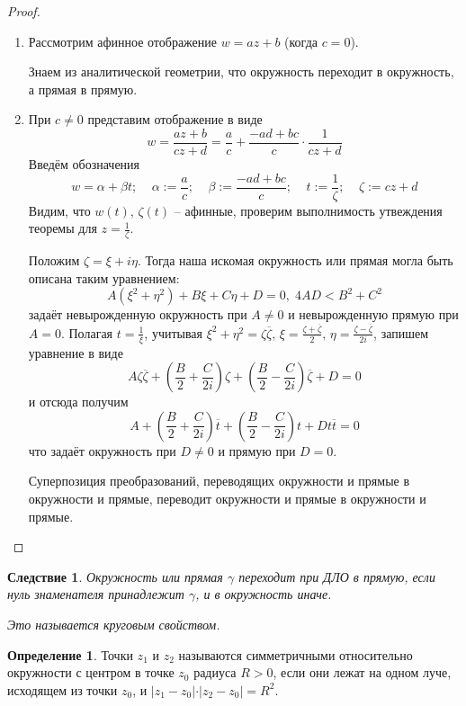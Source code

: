 \documentclass[a4paper,12pt]{article}
\theoremstyle{plain}
\newtheorem*{corollary}{Следствие}
\theoremstyle{definition}
\newtheorem{definition}{Определение}[section]
\theoremstyle{remark}
\begin{document}
\begin{proof}
	\begin{enumerate}
		\item Рассмотрим афинное отображение $w = az + b$ (когда $c = 0$).

		      Знаем из аналитической геометрии, что окружность переходит в окружность, а прямая в прямую.
		\item При $c \neq 0$ представим отображение в виде
		      \[
			      w = \frac{az + b}{cz + d} = \frac{a}{c} + \frac{-ad + bc}{c}\cdot\frac{1}{cz + d}
		      \]
		      Введём обозначения
		      \[
			      w = \alpha + \beta t;\;\;\;\; \alpha := \frac{a}{c};\;\;\;\; \beta := \frac{-ad + bc}{c};\;\;\;\; t := \frac{1}{\zeta} ;\;\;\;\; \zeta := cz + d
		      \]
		      Видим, что $w(t),\, \zeta(t)$ -- афинные, проверим выполнимость утвеждения теоремы для $z = \frac{1}{\zeta}$.

		      Положим $\zeta = \xi + i\eta$. Тогда наша искомая окружность или прямая могла быть описана таким уравнением:
		      \[
			      A(\xi^2 + \eta^2) + B\xi + C\eta + D = 0,\; 4AD < B^2 + C^2
		      \]
		      задаёт невырожденную окружность при $A \neq 0$ и невырожденную прямую при $A = 0$. Полагая $t = \frac{1}{\xi}$, учитывая $\xi^2 + \eta^2 = \zeta\overline{\zeta},\, \xi = \frac{\zeta + \overline{\zeta}}{2},\, \eta = \frac{\zeta - \overline{\zeta}}{2i}$, запишем уравнение в виде
		      \[
			      A\zeta\overline{\zeta} + \left(\frac{B}{2} + \frac{C}{2i}\right)\zeta + \left(\frac{B}{2} - \frac{C}{2i}\right)\overline{\zeta} + D = 0
		      \]
		      и отсюда получим
		      \[
			      A + \left(\frac{B}{2} + \frac{C}{2i}\right)\overline{t} + \left(\frac{B}{2} - \frac{C}{2i}\right)t + Dt\overline{t} = 0
		      \]
		      что задаёт окружность при $D \neq 0$ и прямую при $D = 0$.

		      Суперпозиция преобразований, переводящих окружности и прямые в окружности и прямые, переводит окружности и прямые в окружности и прямые.
	\end{enumerate}
\end{proof}

\begin{corollary}
	Окружность или прямая $\gamma$ переходит при ДЛО в прямую, если нуль знаменателя принадлежит $\gamma$, и в окружность иначе.

	Это называется круговым свойством.
\end{corollary}

\begin{definition}
	Точки $z_1$ и $z_2$ называются симметричными относительно окружности с центром в точке $z_0$ радиуса $R > 0$, если они лежат на одном луче, исходящем из точки $z_0$, и $\vert z_1 - z_0\vert\cdot\vert z_2 - z_0\vert = R^2$.
\end{definition}
\end{document}
